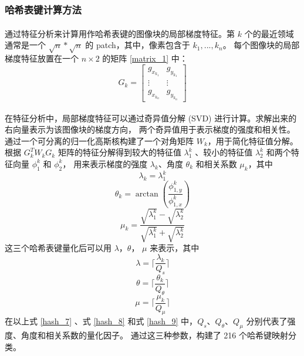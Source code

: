 \documentclass[12pt, a4paper, oneside]{ctexbook}
\begin{document}
	\subsubsection{哈希表键计算方法}
	通过特征分析\textsuperscript{\cite{6}}来计算用作哈希表键的图像块的局部梯度特征。第 $k$ 个的最近领域通常是一个 $\sqrt{n}*\sqrt{n}$ 的 patch，其中，像素包含于 $k_1,...,k_n$。
	每个图像块的局部梯度特征放置在一个 $n \times 2$ 的矩阵 \ref{matrix_1} 中：
	\begin{equation}
		G_k=
		\left[
		\begin{matrix}
			{g_{x_{k_1}}} & {g_{y_{k_1}}}\\
			\vdots & \vdots\\
			{g_{x_{k_n}}} & {g_{y_{k_n}}}
		\end{matrix}
		\right]\label{matrix_1}
	\end{equation}
	\par 在特征分析\textsuperscript{\cite{6}}中，局部梯度特征可以通过奇异值分解 (SVD) 进行计算。求解出来的右向量表示为该图像块的梯度方向，
	两个奇异值用于表示梯度的强度和相关性。通过一个可分离的归一化高斯核构建了一个对角矩阵 $W_k$，用于简化特征值分解。
	根据 $G_k^TW_kG_k$ 矩阵的特征分解得到较大的特征值 $\lambda_1^k$ 、较小的特征值 $\lambda_2^k$ 和两个特征向量 $\phi_1^k$ 和 $\phi_2^k$，
	用来表示梯度的强度 $\lambda_k$、角度 $\theta_k$ 和相关系数 $\mu_k$，其中
	\begin{equation}
		\lambda_k=\lambda_1^k
	\end{equation}
	\begin{equation}
		\theta_k=\arctan(\frac{\phi_{1,y}^k}{\phi_{1,x}^k}) 
	\end{equation}
	\begin{equation}
		\mu_k=\frac{\sqrt{\lambda_1^k}-\sqrt{\lambda_2^k}}{\sqrt{\lambda_1^k}+\sqrt{\lambda_2^k}} 
	\end{equation}
	这三个哈希表键量化后可以用 $\lambda$，$\theta$， $\mu$ 来表示，其中
	\begin{equation}
		\lambda=\lceil\frac{\lambda_k}{Q_s}\rceil		\label{hash_7}
	\end{equation}
	\begin{equation}
		\theta=\lceil\frac{\theta_k}{Q_\theta}\rceil	\label{hash_8}
	\end{equation}
	\begin{equation}
		\mu=\lceil\frac{\mu_k}{Q_\mu}\rceil				\label{hash_9}
	\end{equation}
	在以上式 \ref{hash_7} 、式 \ref{hash_8} 和式 \ref{hash_9} 中，$Q_s$、$Q_\theta$、$Q_\mu$ 分别代表了强度、角度和相关系数的量化因子。
	通过这三种参数，构建了 216 个哈希键映射分类。
	
\end{document}

